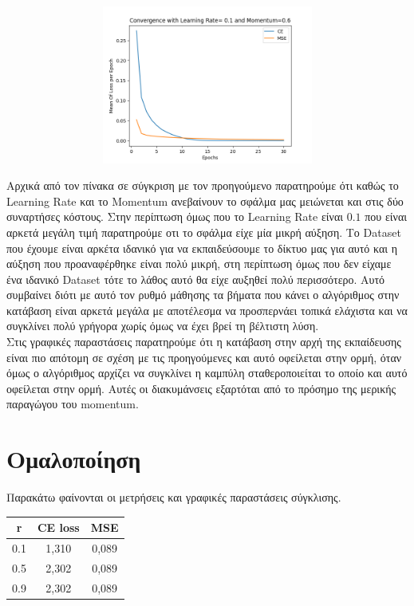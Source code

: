 \documentclass[12pt,a4paper]{article}
\newcommand{\tl}{\textlatin}
\begin{document}
        \begin{figure}[h]
            \raggedright
            \begin{subfigure}[t]{0.5\textwidth}
               \includegraphics[width=10cm,height=5.2cm,left]{images/0.1_0.6.png}
            \end{subfigure}
        \end{figure}
        Αρχικά από τον πίνακα σε σύγκριση με τον προηγούμενο παρατηρούμε ότι καθώς το \tl{Learning Rate} και το \tl{Momentum} ανεβαίνουν το σφάλμα μας μειώνεται και στις δύο συναρτήσες κόστους. Στην περίπτωση όμως που το \tl{Learning Rate} είναι $0.1$ που είναι αρκετά μεγάλη τιμή παρατηρούμε οτι το σφάλμα είχε μία μικρή αύξηση. Το \tl{Dataset} που έχουμε είναι αρκέτα ιδανικό για να εκπαιδεύσουμε το δίκτυο μας για αυτό και η αύξηση που προαναφέρθηκε είναι πολύ μικρή, στη περίπτωση όμως που δεν είχαμε ένα ιδανικό \tl{Dataset} τότε το λάθος αυτό θα είχε αυξηθεί πολύ περισσότερο. Αυτό συμβαίνει διότι με αυτό τον ρυθμό μάθησης τα βήματα που κάνει ο αλγόριθμος στην κατάβαση είναι αρκετά μεγάλα με αποτέλεσμα να προσπερνάει τοπικά ελάχιστα και να συγκλίνει πολύ γρήγορα χωρίς όμως να έχει βρεί τη βέλτιστη λύση.\\ Στις γραφικές παραστάσεις παρατηρούμε ότι η κατάβαση στην αρχή της εκπαίδευσης είναι πιο απότομη σε σχέση με τις προηγούμενες και αυτό οφείλεται στην ορμή, όταν όμως ο αλγόριθμος αρχίζει να συγκλίνει η καμπύλη σταθεροποιείται το οποίο και αυτό οφείλεται στην ορμή. Αυτές οι διακυμάνσεις εξαρτόται από το πρόσημο της μερικής παραγώγου του \tl{momentum}.

    \section{Ομαλοποίηση}
        Παρακάτω φαίνονται οι μετρήσεις και γραφικές παραστάσεις σύγκλισης.
        \begin{table}[h]
            \centering
            \begin{tabular}{|c | c | c | }
                \hline
                \tl{r}  & \tl{CE loss} & \tl{MSE} \\
                \hline
                0.1  & 1,310 & 0,089 \\ 
                0.5  & 2,302 & 0,089 \\ 
                0.9   & 2,302 & 0,089 \\ 
                \hline 
            \end{tabular} 
        \end{table}
\end{document}

